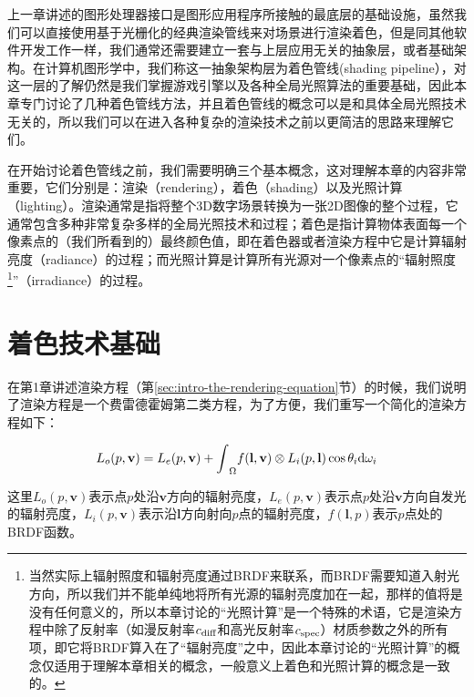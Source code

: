 上一章讲述的图形处理器接口是图形应用程序所接触的最底层的基础设施，虽然我们可以直接使用基于光栅化的经典渲染管线来对场景进行渲染着色，但是同其他软件开发工作一样，我们通常还需要建立一套与上层应用无关的抽象层，或者基础架构。在计算机图形学中，我们称这一抽象架构层为着色管线(shading pipeline），对这一层的了解仍然是我们掌握游戏引擎以及各种全局光照算法的重要基础，因此本章专门讨论了几种着色管线方法，并且着色管线的概念可以是和具体全局光照技术无关的，所以我们可以在进入各种复杂的渲染技术之前以更简洁的思路来理解它们。

在开始讨论着色管线之前，我们需要明确三个基本概念，这对理解本章的内容非常重要，它们分别是：渲染（rendering），着色（shading）以及光照计算（lighting）。渲染通常是指将整个3D数字场景转换为一张2D图像的整个过程，它通常包含多种非常复杂多样的全局光照技术和过程；着色是指计算物体表面每一个像素点的（我们所看到的）最终颜色值，即在着色器或者渲染方程中它是计算辐射亮度（radiance）的过程；而光照计算是计算所有光源对一个像素点的“辐射照度\footnote{当然实际上辐射照度和辐射亮度通过BRDF来联系，而BRDF需要知道入射光方向，所以我们并不能单纯地将所有光源的辐射亮度加在一起，那样的值将是没有任何意义的，所以本章讨论的“光照计算”是一个特殊的术语，它是渲染方程中除了反射率（如漫反射率$c_{\rm diff}$和高光反射率$c_{\rm spec}$）材质参数之外的所有项，即它将BRDF算入在了“辐射亮度”之中，因此本章讨论的“光照计算”的概念仅适用于理解本章相关的概念，一般意义上着色和光照计算的概念是一致的。}”（irradiance）的过程。



\section{着色技术基础}
在第1章讲述渲染方程（第\ref{sec:intro-the-rendering-equation}节）的时候，我们说明了渲染方程是一个费雷德霍姆第二类方程，为了方便，我们重写一个简化的渲染方程如下：

\begin{equation}\label{eq:shade-rendering-equation}
	L_o(p,\mathbf{v})=L_e(p,\mathbf{v})+{\rm \int}_\Omega f(\mathbf{l},\mathbf{v})\otimes L_i(p,\mathbf{l})\cos{\theta_i}{\rm d}\omega_i
\end{equation}

这里$L_o(p,\mathbf{v})$表示点$p$处沿$\mathbf{v}$方向的辐射亮度，$L_e(p,\mathbf{v})$表示点$p$处沿$\mathbf{v}$方向自发光的辐射亮度，$L_i(p,\mathbf{v})$表示沿$\mathbf{l}$方向射向$p$点的辐射亮度，$f(\mathbf{l},p)$表示$p$点处的BRDF函数。

